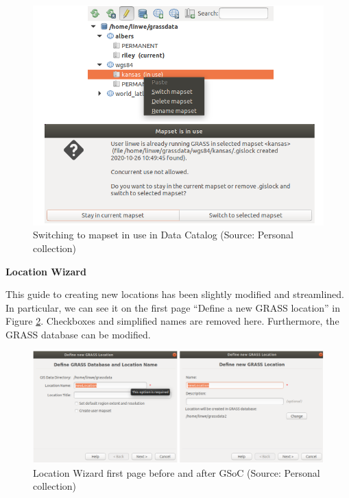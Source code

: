 \documentclass[a4paper,10pt,twoside]{article}
\begin{document}
\vspace{0.3cm}
\begin{figure}[hbt!] 
\begin{center}
\includegraphics[width=13cm]{../pictures/data_catalog_switch.png} 
\caption[Switching to mapset in use in Data Catalog]{Switching to mapset in use in Data Catalog (Source: Personal collection)}
\label{fig:data_catalog_switch_new}
\end{center}
\end{figure}


\bigskip
\noindent \textbf {Location Wizard}

\noindent This guide to creating new locations has been slightly
modified and streamlined. In particular, we can see it on the first
page ``Define a new GRASS location'' in Figure
\ref{fig:loc_wiz_1}. Checkboxes and simplified names are removed
here. Furthermore, the GRASS database can be modified.

\vspace{0.3cm}
\begin{figure}[hbt!] 
\begin{center}
\includegraphics[width=17cm]{../pictures/loc_wiz_1.png} 
\caption[Location Wizard first page before and after GSoC]{Location Wizard first page before and after GSoC (Source: Personal collection)}
\label{fig:loc_wiz_1}
\end{center}
\end{figure}
\end{document}
